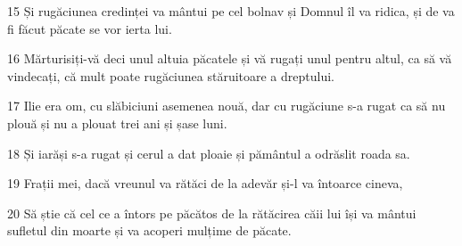 \par 15 Și rugăciunea credinței va mântui pe cel bolnav și Domnul îl va ridica, și de va fi făcut păcate se vor ierta lui.
\par 16 Mărturisiți-vă deci unul altuia păcatele și vă rugați unul pentru altul, ca să vă vindecați, că mult poate rugăciunea stăruitoare a dreptului.
\par 17 Ilie era om, cu slăbiciuni asemenea nouă, dar cu rugăciune s-a rugat ca să nu plouă și nu a plouat trei ani și șase luni.
\par 18 Și iarăși s-a rugat și cerul a dat ploaie și pământul a odrăslit roada sa.
\par 19 Frații mei, dacă vreunul va rătăci de la adevăr și-l va întoarce cineva,
\par 20 Să știe că cel ce a întors pe păcătos de la rătăcirea căii lui își va mântui sufletul din moarte și va acoperi mulțime de păcate.


